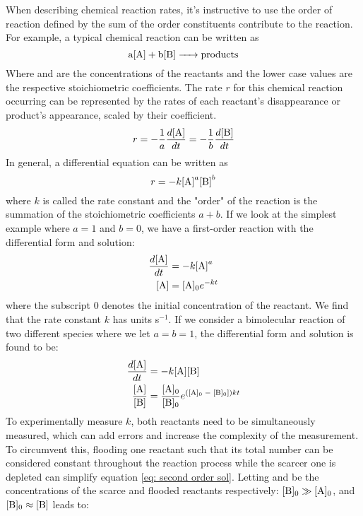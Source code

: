 When describing chemical reaction rates, it's instructive to use the order of reaction defined by the sum of the order constituents contribute to the reaction. For example, a typical chemical reaction can be written as
\begin{equation}
	\ce{a[A] + b[B] -> products}
	\label{eq: general reaction}
\end{equation}
Where \ce{[A]} and \ce{[B]} are the concentrations of the reactants and the lower case values are the respective stoichiometric coefficients. The rate $r$ for this chemical reaction occurring can be represented by the rates of each reactant's disappearance or product's appearance, scaled by their coefficient.
\begin{equation}
	r = -\frac{1}{a}\frac{d\ce{[A]}}{dt} = -\frac{1}{b}\frac{d\ce{[B]}}{dt}
\end{equation}
In general, a differential equation can be written as
\begin{equation}
	r = -k\ce{[A]}^a\ce{[B]}^b
	\label{eq: diff rate form}
\end{equation}
where $k$ is called the rate constant and the "order" of the reaction is the summation of the stoichiometric coefficients $a+b$. If we look at the simplest example where $a=1$ and $b=0$, we have a first-order reaction with the differential form and solution:
\begin{align}
	\frac{d \ce{[A]}}{dt} & = -k\ce{[A]}^a \nonumber \\
	\ce{[A]} & = \ce{[A]0}e^{-kt} \label{eq: first order sol}
\end{align}
where the subscript $0$ denotes the initial concentration of the reactant. We find that the rate constant $k$ has units s$^{-1}$. If we consider a bimolecular reaction of two different species where we let $a=b=1$, the differential form and solution is found to be:
\begin{align}
	\frac{d \ce{[A]}}{dt} & = -k \ce{[A]}\ce{[B]} \nonumber \\
	\frac{\ce{[A]}}{\ce{[B]}} & = \frac{\ce{[A]0}}{\ce{[B]0}}e^{(\ce{[A]0 - [B]0}])kt} \label{eq: second order sol}
\end{align}
To experimentally measure $k$, both reactants need to be simultaneously measured, which can add errors and increase the complexity of the measurement. To circumvent this, flooding one reactant such that its total number can be considered constant throughout the reaction process while the scarcer one is depleted can simplify equation \ref{eq: second order sol}. Letting \ce{[A]} and \ce{[B]} be the concentrations of the scarce and flooded reactants respectively: $\ce{[B]0} \gg \ce{[A]0}$, and $\ce{[B]0} \approx \ce{[B]}$ leads to:
